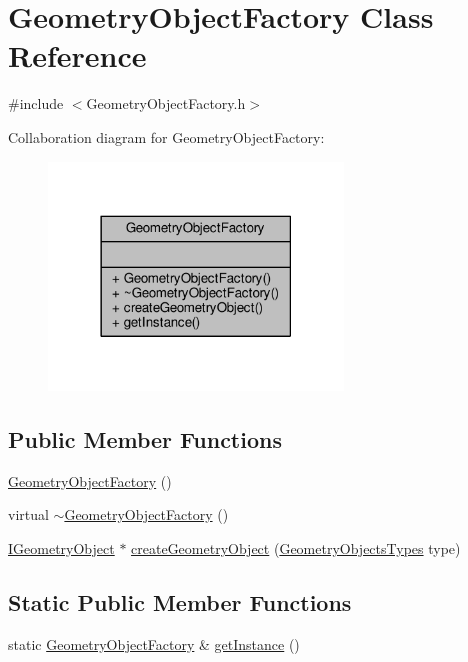 \hypertarget{class_geometry_object_factory}{\section{Geometry\-Object\-Factory Class Reference}
\label{class_geometry_object_factory}
}


{\ttfamily \#include $<$Geometry\-Object\-Factory.\-h$>$}



Collaboration diagram for Geometry\-Object\-Factory\-:
\nopagebreak
\begin{figure}[H]
\begin{center}
\leavevmode
\includegraphics[width=222pt]{class_geometry_object_factory__coll__graph}
\end{center}
\end{figure}
\subsection*{Public Member Functions}
\begin{DoxyCompactItemize}
\item 
\hyperlink{class_geometry_object_factory_a759b281e3db965d1517d1490ef6d715d}{Geometry\-Object\-Factory} ()
\item 
virtual \hyperlink{class_geometry_object_factory_a1cc18355ea7a691ac628dcbc0b8cc76d}{$\sim$\-Geometry\-Object\-Factory} ()
\item 
\hyperlink{class_i_geometry_object}{I\-Geometry\-Object} $\ast$ \hyperlink{class_geometry_object_factory_ac1b7a6573f7dee62d37ff55e23ea16bc}{create\-Geometry\-Object} (\hyperlink{_geometry_objects_types_8h_adea8b8c3a289ca1fc1450d9424dcd33d}{Geometry\-Objects\-Types} type)
\end{DoxyCompactItemize}
\subsection*{Static Public Member Functions}
\begin{DoxyCompactItemize}
\item 
static \hyperlink{class_geometry_object_factory}{Geometry\-Object\-Factory} \& \hyperlink{class_geometry_object_factory_a517fdd10bb45b6d7cf924d9cbacca6d1}{get\-Instance} ()
\end{DoxyCompactItemize}


